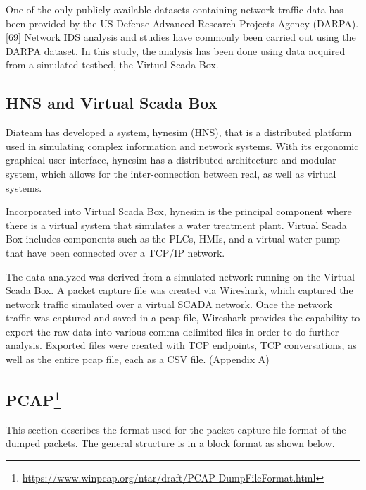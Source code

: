 \documentclass[11pt,]{article}
\let\rmarkdownfootnote\footnote%
\def\footnote{\protect\rmarkdownfootnote}
\begin{document}
One of the only publicly available datasets containing network traffic
data has been provided by the US Defense Advanced Research Projects
Agency (DARPA).{[}69{]} Network IDS analysis and studies have commonly
been carried out using the DARPA dataset. In this study, the analysis
has been done using data acquired from a simulated testbed, the Virtual
Scada Box.

\subsection{HNS and Virtual Scada Box}\label{hns-and-virtual-scada-box}

Diateam has developed a system, hynesim (HNS), that is a distributed
platform used in simulating complex information and network systems.
With its ergonomic graphical user interface, hynesim has a distributed
architecture and modular system, which allows for the inter-connection
between real, as well as virtual systems.

Incorporated into Virtual Scada Box, hynesim is the principal component
where there is a virtual system that simulates a water treatment plant.
Virtual Scada Box includes components such as the PLCs, HMIs, and a
virtual water pump that have been connected over a TCP/IP network.

The data analyzed was derived from a simulated network running on the
Virtual Scada Box. A packet capture file was created via Wireshark,
which captured the network traffic simulated over a virtual SCADA
network. Once the network traffic was captured and saved in a pcap file,
Wireshark provides the capability to export the raw data into various
comma delimited files in order to do further analysis. Exported files
were created with TCP endpoints, TCP conversations, as well as the
entire pcap file, each as a CSV file. (Appendix A)

\subsection[PCAP]{PCAP\footnote{\url{https://www.winpcap.org/ntar/draft/PCAP-DumpFileFormat.html}}}\label{pcap8}

This section describes the format used for the packet capture file
format of the dumped packets. The general structure is in a block format
as shown below.

\newpage
\end{document}
